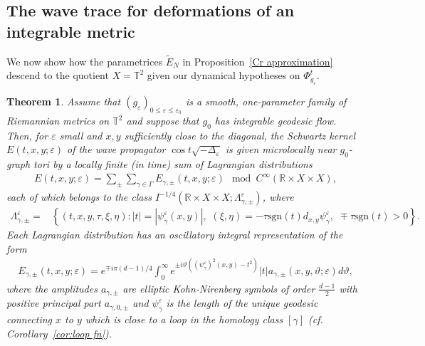 \documentclass[11pt,letterpaper,oneside]{amsart}
\newcommand{\R}{\mathbb{R}}
\newcommand{\T}{\mathbb{T}}
\renewcommand{\theta}{\vartheta}
\newtheorem{theo}{Theorem}[section]
\theoremstyle{definition}
\theoremstyle{remark}
\newcommand{\eps}{\varepsilon}
\newcommand{\wt}{\widetilde}
\theoremstyle{definition}
\theoremstyle{remark}
\begin{document}
\subsection{The wave trace for deformations of an integrable metric}\label{sec: wave trace for deformations of an integral metric}
We now show how the parametrices $\wt E_N$ in Proposition~\ref{Cr approximation} descend to the quotient $X = \T^2$ given our dynamical hypotheses on $\Phi_{g_\eps}^t$.


\begin{theo}\label{parametrix}
    Assume that $(g_\eps)_{0 \leq \eps \leq \eps_0}$ is a smooth, one-parameter family of Riemannian metrics on $\T^2$ and suppose that $g_0$ has integrable geodesic flow. Then, for $\eps$ small and $x,y$ sufficiently close to the diagonal, the Schwartz kernel $E(t,x,y; \eps)$ of the wave propagator $\cos t \sqrt{-\Delta_\eps}$ is given microlocally near $g_0$-graph tori by a locally finite (in time) sum of Lagrangian distributions
    \begin{align*}
        E(t, x, y; \eps) = \sum_{\pm} \sum_{\gamma \in \Gamma} E_{\gamma, \pm}(t, x,y; \eps) \mod C^\infty(\R \times X \times X),
    \end{align*}
    each of which belongs to the class $I^{-1/4}(\R \times X \times X; \Lambda_{\gamma,\pm}^\eps)$, where
    \begin{align*}
        \Lambda_{\gamma, \pm}^\eps = & \left \{ (t, x, y, \tau, \xi, \eta): |t| = |\psi_\gamma^\eps(x,y)|,\,\, (\xi, \eta) = - \tau \text{sgn}(t) d_{x,y} \psi_\gamma^\eps, \,\, \mp \tau \text{sgn}(t) > 0 \right\}.
    \end{align*}
    Each Lagrangian distribution has an oscillatory integral representation of the form
    \begin{align*}
        E_{\gamma, \pm}(t,x,y;\eps) = e^{\mp i \pi (d-1)/ 4} \int_0^\infty e^{\pm i \theta ((\psi_{\gamma}^\eps)^2(x,y)  - t^2)} |t| a_{\gamma, \pm} (x,y, \theta; \eps) d\theta,
    \end{align*}
    where the amplitudes $a_{\gamma, \pm}$ are elliptic Kohn-Nirenberg symbols of order $\frac{d-1}{2}$ with positive principal part $a_{\gamma, 0, \pm}$ and $\psi_\gamma^\eps$ is the length of the unique geodesic connecting $x$ to $y$ which is close to a loop in the homology class $[\gamma]$ (cf. Corollary~\ref{cor:loop fn}).
\end{theo}
\end{document}

